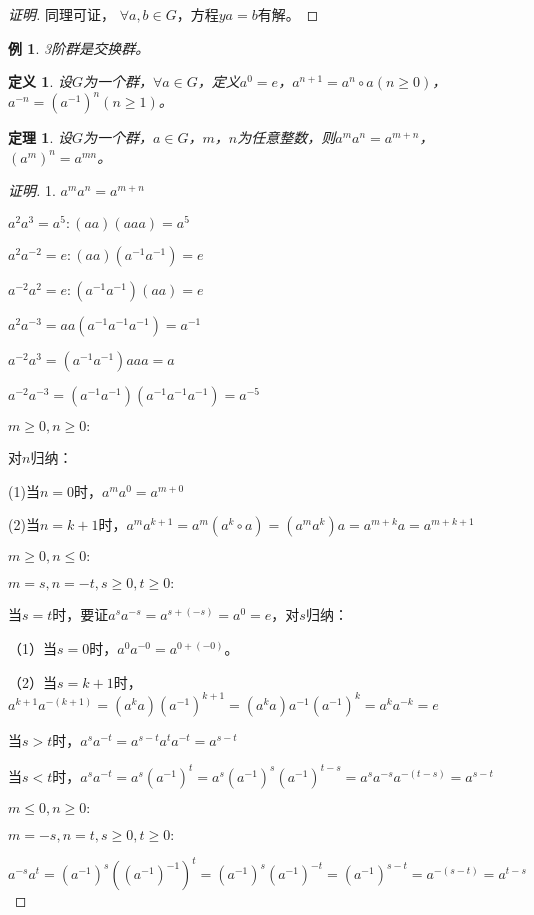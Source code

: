 \documentclass{article}
\newtheorem{Def}{定义}
\newtheorem{Thm}{定理}
\newtheorem*{Example}{例}
\begin{document}
\begin{CJK*}{UTF8}{gbsn}
\begin{proof}[证明]
  同理可证，  $\forall a,b\in G$，方程$ya=b$有解。
  \end{proof}
  
  \begin{Example}
    3阶群是交换群。
  \end{Example}
  \begin{Def}
    设$G$为一个群，$\forall a\in G$，定义$a^0=e$，$a^{n+1}=a^n\circ a$$(n\geq 0)$，$a^{-n}=(a^{-1})^n$$(n\geq 1)$。
  \end{Def}
  \begin{Thm}
  设$G$为一个群，$a\in G$，$m$，$n$为任意整数，则$a^ma^n=a^{m+n}$，$(a^m)^n=a^{mn}$。
  \end{Thm}
  \begin{proof}[证明]
    1. $a^ma^n=a^{m+n}$
  
  $a^2a^3=a^5:(aa)(aaa)=a^5$
  
  $a^2a^{-2}=e:(aa)(a^{-1}a^{-1})=e$
  
  $a^{-2}a^{2}=e:(a^{-1}a^{-1})(aa)=e$
  
  $a^2a^{-3}=aa(a^{-1}a^{-1}a^{-1})=a^{-1}$
  
  $a^{-2}a^3=(a^{-1}a^{-1})aaa=a$
  
  
  
  $a^{-2}a^{-3}=(a^{-1}a^{-1})(a^{-1}a^{-1}a^{-1})=a^{-5}$
  
  $m\geq 0,n\geq 0:$
  
  对$n$归纳：
  
  (1)当$n=0$时，$a^ma^0=a^{m+0}$
  
  (2)当$n=k+1$时，$a^{m}a^{k+1}=a^m(a^k\circ a)=(a^ma^k)a=a^{m+k}a=a^{m+k+1}$
  
  $m\geq 0,n \leq 0:$
  
  
  $m=s,n=-t, s\geq 0,t\geq 0:$
  
  当$s=t$时，要证$a^{s}a^{-s}=a^{s+(-s)}=a^0=e$，对$s$归纳：
  
  （1）当$s=0$时，$a^0a^{-0}=a^{0+(-0)}$。
  
  （2）当$s=k+1$时，$a^{k+1}a^{-(k+1)}=(a^ka)(a^{-1})^{k+1}=(a^ka)a^{-1}(a^{-1})^k=a^ka^{-k}=e$
  
  当$s>t$时，$a^sa^{-t}=a^{s-t}a^{t}a^{-t}=a^{s-t}$
  
  当$s<t$时，$a^sa^{-t}=a^s(a^{-1})^t=a^s(a^{-1})^s(a^{-1})^{t-s}=a^sa^{-s}a^{-(t-s)}=a^{s-t}$
  
  $m\leq 0, n\geq 0:$
  
  $m=-s,n=t,s\geq 0, t\geq 0:$
  
  $a^{-s}a^t=(a^{-1})^s((a^{-1})^{-1})^t=(a^{-1})^s(a^{-1})^{-t}=(a^{-1})^{s-t}=a^{-(s-t)}=a^{t-s}$
  

\end{proof}
\end{CJK*}
\end{document}
